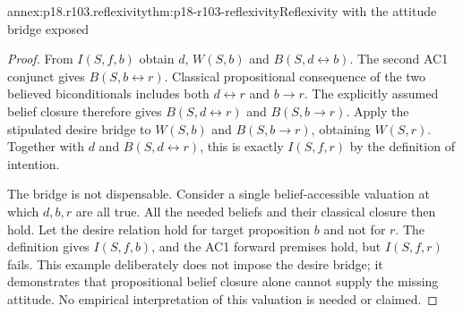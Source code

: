 \begin{annexitem}{annex:p18.r103.reflexivity}{thm:p18-r103-reflexivity}{Reflexivity with the attitude bridge exposed}
\begin{proof}
From \(I(S,f,b)\) obtain \(d\), \(W(S,b)\) and
\(B(S,d\leftrightarrow b)\). The second AC1 conjunct gives
\(B(S,b\leftrightarrow r)\). Classical propositional consequence
of the two believed biconditionals includes both
\(d\leftrightarrow r\) and \(b\to r\). The explicitly assumed
belief closure therefore gives \(B(S,d\leftrightarrow r)\) and
\(B(S,b\to r)\). Apply the stipulated desire bridge to
\(W(S,b)\) and \(B(S,b\to r)\), obtaining \(W(S,r)\).
Together with \(d\) and \(B(S,d\leftrightarrow r)\), this is
exactly \(I(S,f,r)\) by the definition of intention.

The bridge is not dispensable. Consider a single belief-accessible
valuation at which \(d,b,r\) are all true. All the needed beliefs
and their classical closure then hold. Let the desire relation hold
for target proposition \(b\) and not for \(r\). The definition
gives \(I(S,f,b)\), and the AC1 forward premises hold, but
\(I(S,f,r)\) fails. This example deliberately does not impose the
desire bridge; it demonstrates that propositional belief closure alone
cannot supply the missing attitude. No empirical interpretation of this
valuation is needed or claimed.
\end{proof}
\end{annexitem}

